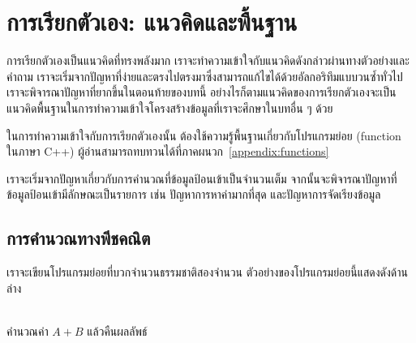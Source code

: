 \chapter{การ{\wbr}เรียก{\wbr}ตัวเอง: แนว{\wbr}คิด{\wbr}และ{\wbr}พื้นฐาน}

การ{\wbr}เรียก{\wbr}ตัวเอง{\wbr}เป็น{\wbr}แนว{\wbr}คิด{\wbr}ที่{\wbr}ทรง{\wbr}พลัง{\wbr}มาก{\wbr}
เรา{\wbr}จะ{\wbr}ทำ{\wbr}ความ{\wbr}เข้าใจ{\wbr}กับ{\wbr}แนว{\wbr}คิด{\wbr}ดังกล่าว{\wbr}ผ่าน{\wbr}ทาง{\wbr}ตัวอย่าง{\wbr}และ{\wbr}คำถาม{\wbr}
เรา{\wbr}จะ{\wbr}เริ่ม{\wbr}จาก{\wbr}ปัญหา{\wbr}ที่{\wbr}ง่าย{\wbr}และ{\wbr}ตรงไปตรงมา{\wbr}ซึ่ง{\wbr}สามารถ{\wbr}แก้ไข{\wbr}ได้{\wbr}ด้วย{\wbr}อัล{\wbr}กอ{\wbr}ริ{\wbr}ทึม{\wbr}แบบ{\wbr}วน{\wbr}ซ้ำ{\wbr}ทั่วไป{\wbr}
เรา{\wbr}จะ{\wbr}พิจารณา{\wbr}ปัญหา{\wbr}ที่{\wbr}ยาก{\wbr}ขึ้น{\wbr}ใน{\wbr}ตอน{\wbr}ท้าย{\wbr}ของ{\wbr}บท{\wbr}นี้{\wbr}
อย่างไรก็ตาม{\wbr}แนว{\wbr}คิด{\wbr}ของ{\wbr}การ{\wbr}เรียก{\wbr}ตัวเอง{\wbr}จะ{\wbr}เป็น{\wbr}แนว{\wbr}คิด{\wbr}พื้นฐาน{\wbr}ใน{\wbr}การ{\wbr}ทำ{\wbr}ความ{\wbr}เข้าใจ{\wbr}โครงสร้าง{\wbr}ข้อมูล{\wbr}ที่{\wbr}เรา{\wbr}จะ{\wbr}ศึกษา{\wbr}ใน{\wbr}บท{\wbr}อื่น ๆ ด้วย{\wbr}

ใน{\wbr}การ{\wbr}ทำ{\wbr}ความ{\wbr}เข้าใจ{\wbr}กับ{\wbr}การ{\wbr}เรียก{\wbr}ตัวเอง{\wbr}นั้น ต้อง{\wbr}ใช้{\wbr}ความ{\wbr}รู้{\wbr}พื้นฐาน{\wbr}เกี่ยวกับ{\wbr}โปรแกรมย่อย{\wbr}
(function ใน{\wbr}ภาษา C++)
ผู้อ่าน{\wbr}สามารถ{\wbr}ทบทวน{\wbr}ได้{\wbr}ที่{\wbr}ภาคผนวก~\ref{appendix:functions}

เรา{\wbr}จะ{\wbr}เริ่ม{\wbr}จาก{\wbr}ปัญหา{\wbr}เกี่ยวกับ{\wbr}การ{\wbr}คำนวณ{\wbr}ที่{\wbr}ข้อมูล{\wbr}ป้อน{\wbr}เข้า{\wbr}เป็น{\wbr}จำนวนเต็ม{\wbr}
จากนั้น{\wbr}จะ{\wbr}พิจารณา{\wbr}ปัญหา{\wbr}ที่{\wbr}ข้อมูล{\wbr}ป้อน{\wbr}เข้า{\wbr}มี{\wbr}ลักษณะ{\wbr}เป็น{\wbr}รายการ เช่น ปัญหา{\wbr}การ{\wbr}หา{\wbr}ค่า{\wbr}มาก{\wbr}ที่สุด{\wbr}
และ{\wbr}ปัญหา{\wbr}การ{\wbr}จัดเรียง{\wbr}ข้อมูล 

\section{การ{\wbr}คำนวณ{\wbr}ทาง{\wbr}พีชคณิต}

เรา{\wbr}จะ{\wbr}เขียน{\wbr}โปรแกรมย่อย{\wbr}ที่{\wbr}บวก{\wbr}จำนวน{\wbr}ธรรมชาติ{\wbr}สอง{\wbr}จำนวน ตัวอย่าง{\wbr}ของ{\wbr}โปรแกรมย่อย{\wbr}นี้{\wbr}แสดง{\wbr}ดัง{\wbr}ด้าน{\wbr}ล่าง{\wbr}

\begin{algt}
\\
\hspace*{0.2in} คำนวณ{\wbr}ค่า $A+B$ แล้ว{\wbr}คืน{\wbr}ผลลัพธ์{\wbr}
\end{algt}

